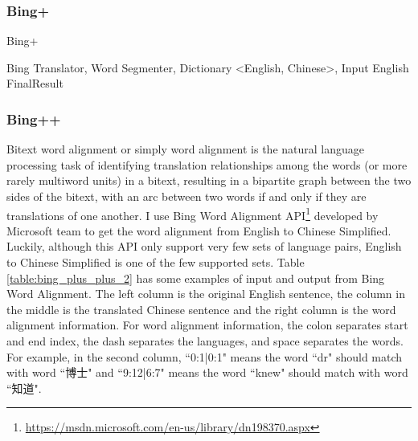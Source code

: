 \documentclass[11pt]{article}
\begin{document}
\subsubsection{Bing+}
\begin{algorithm}[ht]
\caption{Bing+}
\label{algorithm:wsd_4}
\begin{algorithmic}
\REQUIRE Bing Translator, Word Segmenter, Dictionary \textless English, Chinese\textgreater, Input English
        \ENDIF
    \ENDFOR
        \ENDIF
    \ENDFOR
\ENDIF
\RETURN FinalResult
\end{algorithmic}
\end{algorithm}

\subsubsection{Bing++}
Bitext word alignment or simply word alignment is the natural language processing task of identifying translation relationships among the words (or more rarely multiword units) in a bitext, resulting in a bipartite graph between the two sides of the bitext, with an arc between two words if and only if they are translations of one another. I use Bing Word Alignment API\footnote{\url{https://msdn.microsoft.com/en-us/library/dn198370.aspx}} developed by Microsoft team to get the word alignment from English to Chinese Simplified. Luckily, although this API only support very few sets of language pairs, English to Chinese Simplified is one of the few supported sets. Table \ref{table:bing_plus_plus_2} has some examples of input and output from Bing Word Alignment. The left column is the original English sentence, the column in the middle is the translated Chinese sentence and the right column is the word alignment information. For word alignment information, the colon separates start and end index, the dash separates the languages, and space separates the words. For example, in the second column, ``0:1|0:1" means the word ``dr" should match with word ``博士" and ``9:12|6:7" means the word ``knew" should match with word ``知道".
\end{document}
